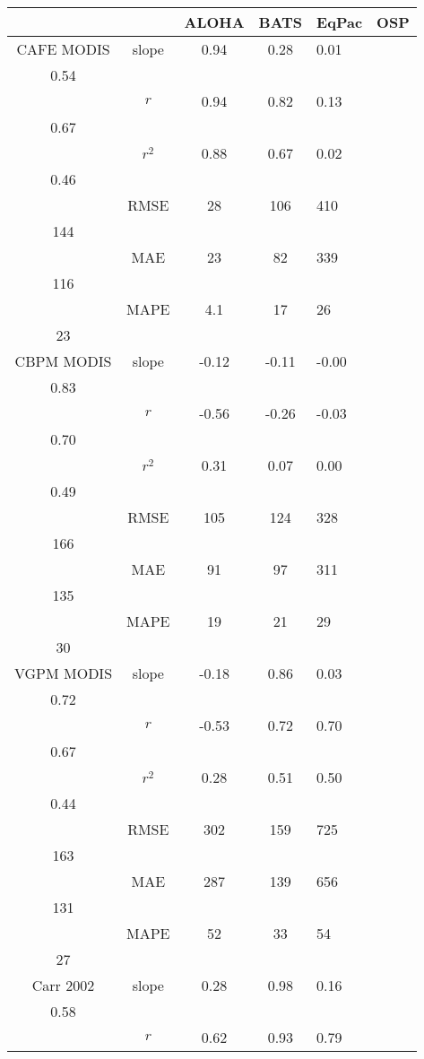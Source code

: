 \begin{table}[h]
\centering
\begin{tabular}{cccc}
\toprule
& & ALOHA & BATS & EqPac & OSP \\
\midrule
CAFE MODIS & slope & 0.94 & 0.28 & 0.01 &  \\
0.54 \\
& $r$ & 0.94 & 0.82 & 0.13 &  \\
0.67 \\
& $r^2$ & 0.88 & 0.67 & 0.02 &  \\
0.46 \\
& RMSE & 28 & 106 & 410 &  \\
144 \\
& MAE & 23 & 82 & 339 &  \\
116 \\
& MAPE & 4.1 & 17 & 26 &  \\
23 \\
\cmidrule(lr){1-6}
CBPM MODIS & slope & -0.12 & -0.11 & -0.00 &  \\
0.83 \\
& $r$ & -0.56 & -0.26 & -0.03 &  \\
0.70 \\
& $r^2$ & 0.31 & 0.07 & 0.00 &  \\
0.49 \\
& RMSE & 105 & 124 & 328 &  \\
166 \\
& MAE & 91 & 97 & 311 &  \\
135 \\
& MAPE & 19 & 21 & 29 &  \\
30 \\
\cmidrule(lr){1-6}
VGPM MODIS & slope & -0.18 & 0.86 & 0.03 &  \\
0.72 \\
& $r$ & -0.53 & 0.72 & 0.70 &  \\
0.67 \\
& $r^2$ & 0.28 & 0.51 & 0.50 &  \\
0.44 \\
& RMSE & 302 & 159 & 725 &  \\
163 \\
& MAE & 287 & 139 & 656 &  \\
131 \\
& MAPE & 52 & 33 & 54 &  \\
27 \\
\cmidrule(lr){1-6}
Carr 2002 & slope & 0.28 & 0.98 & 0.16 &  \\
0.58 \\
& $r$ & 0.62 & 0.93 & 0.79 &  \\

\end{tabular}
\end{table}

